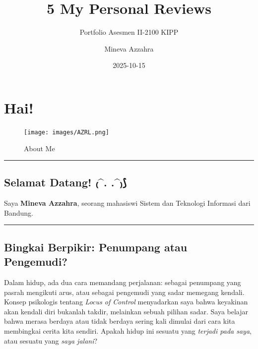 \documentclass[
  letterpaper,
  DIV=11,
  numbers=noendperiod]{scrreprt}
\title{5 My Personal Reviews}
\subtitle{Portfolio Asesmen II-2100 KIPP}
\author{Mineva Azzahra}
\date{2025-10-15}
\renewcommand*\contentsname{Table of contents}
\newcommand\contentsname{Table of contents}
\begin{document}
\maketitle

\renewcommand*\contentsname{Table of contents}
{
\hypersetup{linkcolor=}
\setcounter{tocdepth}{2}
\tableofcontents
}


\chapter*{Hai!}\label{hai}


\begin{figure}[H]

{\centering \texttt{[image: images/AZRL.png]}

}

\caption{About Me}

\end{figure}%

\begin{center}\rule{0.5\linewidth}{0.5pt}\end{center}

\section*{Selamat Datang! ₍\^{}. .\^{}₎⟆}\label{selamat-datang-.-.}


Saya \textbf{Mineva Azzahra}, seorang mahasiswi Sistem dan Teknologi
Informasi dari Bandung.

\begin{center}\rule{0.5\linewidth}{0.5pt}\end{center}

\section*{Bingkai Berpikir: Penumpang atau
Pengemudi?}\label{bingkai-berpikir-penumpang-atau-pengemudi}


Dalam hidup, ada dua cara memandang perjalanan: sebagai penumpang yang
pasrah mengikuti arus, atau sebagai pengemudi yang sadar memegang
kendali. Konsep psikologis tentang \emph{Locus of Control} menyadarkan
saya bahwa keyakinan akan kendali diri bukanlah takdir, melainkan sebuah
pilihan sadar. Saya belajar bahwa merasa berdaya atau tidak berdaya
sering kali dimulai dari cara kita membingkai cerita kita sendiri.
Apakah hidup ini sesuatu yang \emph{terjadi pada saya}, atau sesuatu
yang \emph{saya jalani}?
\end{document}
